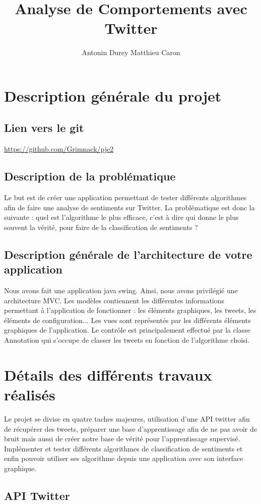 \documentclass[a4paper,10pt]{report}
\title{Analyse de Comportements avec Twitter}
\author{Antonin Durey Matthieu Caron}
\begin{document}
\maketitle
\clearpage
{}
\chapter{Description générale du projet}
  \section{Lien vers le git}
    \url{https://github.com/Grimnack/pje2}
  \section{Description de la problématique}
    Le but est de créer une application permettant de tester différents algorithmes
    afin de faire une analyse de sentiments sur Twitter. La problématique est donc la suivante :
    quel est l'algorithme le plus efficace, c'est à dire qui donne le plus souvent la vérité, pour faire de la 
    classification de sentiments ?
  \section{Description générale de l'architecture de votre application}
    Nous avons fait une application java swing. Ainsi, nous avons privilégié une architecture MVC.
    Les modèles contiennent les différentes informations permettant à l'application de fonctionner : les éléments graphiques, les tweets, les éléments de configuration...
    Les vues sont représentés par les différents éléments graphiques de l'application.
    Le contrôle est principalement effectué par la classe Annotation qui s'occupe de classer les tweets en fonction de l'algorithme choisi. 
\chapter{Détails des différents travaux réalisés}
  Le projet se divise en quatre taches majeures, utilisation d'une API twitter afin de récupérer 
  des tweets, préparer une base d'apprentissage afin de ne pas avoir de bruit mais aussi de créer notre 
  base de vérité pour l'apprentissage supervisé. Implémenter et tester différents algorithmes de classification de sentiments et
  enfin pouvoir utiliser ses algorithme depuis une application avec son interface graphique.
  \section{API Twitter}
\end{document}
